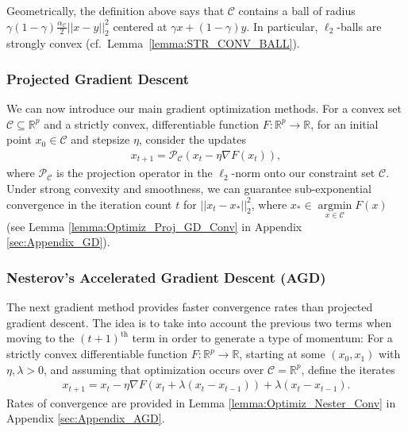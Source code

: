 \documentclass{article}
\begin{document}
Geometrically, the definition above says that $\mathcal{C}$ contains a ball of radius $\gamma(1 - \gamma)\frac{\alpha_{\mathcal{C}}}{2}||x - y||_2^2$ centered at $\gamma x + (1 - \gamma)y$. In particular, $\ell_2$-balls are strongly convex (cf.\ Lemma~\ref{lemma:STR_CONV_BALL}).


\subsubsection{Projected Gradient Descent} \label{sec:Projected Gradient Descent}

We can now introduce our main gradient optimization methods. For a convex set $\mathcal{C} \subseteq \mathbb{R}^p$ and a strictly convex, differentiable function $F : \mathbb{R}^p \rightarrow \mathbb{R}$, for an initial point $x_0 \in \mathcal{C}$ and stepsize $\eta$, consider the updates
\begin{align}
\label{eq:Proj_GD_Rule}
x_{t + 1} = \mathcal{P}_{\mathcal{C}}(x_t - \eta \nabla F(x_t)),
\end{align}
where $\mathcal{P}_{\mathcal{C}}$ is the projection operator in the $\ell_2$-norm onto our constraint set $\mathcal{C}$. Under strong convexity and smoothness, we can guarantee sub-exponential convergence in the iteration count $t$ for $||x_t - x_{*}||_2^2$, where $x_{*} \in \mathop{\arg\min}\limits_{x \in \mathcal{C}}F(x)$ (see Lemma \ref{lemma:Optimiz_Proj_GD_Conv} in Appendix \ref{sec:Appendix_GD}).


\subsubsection{Nesterov's Accelerated Gradient Descent (AGD)} \label{sec:Nesterov's Accelerated Gradient Descent (AGD)}

The next gradient method provides faster convergence rates than projected gradient descent. The idea is to take into account the previous two terms when moving to the $(t + 1)^{\text{th}}$ term in order to generate a type of momentum: For a strictly convex differentiable function $F : \mathbb{R}^p \rightarrow \mathbb{R}$, starting at some $(x_0, x_1)$ with $\eta, \lambda > 0$, and assuming that optimization occurs over $\mathcal{C} = \mathbb{R}^p$, define the iterates
\begin{align}
\label{eq:Nester_Rule}
x_{t + 1} = x_t - \eta\nabla F(x_t + \lambda(x_t - x_{t - 1})) + \lambda(x_t - x_{t - 1}).
\end{align}
Rates of convergence are provided in Lemma \ref{lemma:Optimiz_Nester_Conv} in Appendix \ref{sec:Appendix_AGD}. %
\end{document}
